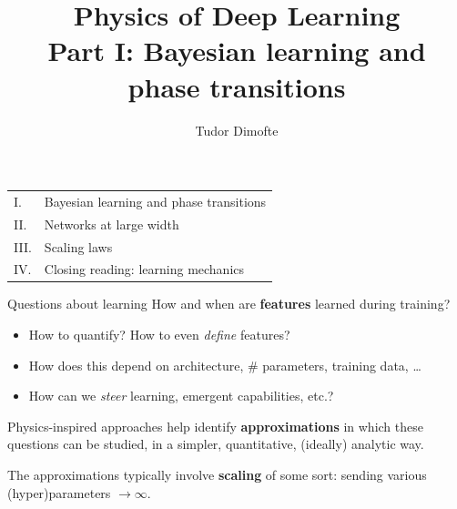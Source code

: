 \documentclass[11pt]{beamer}
\author{Tudor Dimofte}
\institute{Iliad Intensive (Sept. 2026)}
\date{}
\newcommand{\hl}[1]{{\color{blue!60!black}\textbf{#1}}}
\begin{document}
\title{Physics of Deep Learning\\[2pt]
\large Part I: Bayesian learning and phase transitions}
\begin{frame}
  \titlepage
  \begin{center}\small
  \begin{tabular}{ll}
    I. & Bayesian learning and phase transitions \\
    II. & Networks at large width \\
    III. & Scaling laws \\
    IV. & Closing reading: learning mechanics
  \end{tabular}
  \end{center}
\end{frame}

\begin{frame}{Questions about learning}
  How and when are \hl{features} learned during training? \pause
  \begin{itemize}
    \item How to quantify? How to even \emph{define} features?
    \item How does this depend on architecture, \# parameters, training data, \dots
    \item How can we \emph{steer} learning, emergent capabilities, etc.?
  \end{itemize} \pause
  \vspace{4mm}

  Physics-inspired approaches help identify \hl{approximations} in which
  these questions can be studied, in a simpler, quantitative, (ideally)
  analytic way. \pause
  \vspace{3mm}

  The approximations typically involve \hl{scaling} of some sort:
  sending various (hyper)parameters $\to\infty$.
  
  \medskip
  
\end{frame}
\end{document}
